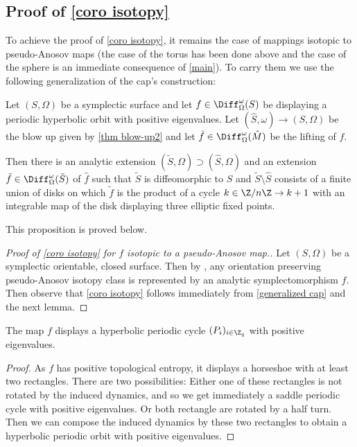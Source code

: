 \subsection{Proof of \cref{coro isotopy}}\label{S42}
To achieve the proof of \cref{coro isotopy}, it remains the case of mappings isotopic to pseudo-Anosov maps (the case of the torus has been done above and the case of the sphere is an immediate consequence of \cref{main}). To carry them we use the following generalization of the cap's construction:
\begin{proposition}\label{generalized cap}Let $(S,\Omega)$ be a symplectic surface and let $f\in \Diff^\omega_\Omega(S)$ be displaying a periodic hyperbolic orbit with positive eigenvalues.
Let $(\hat S,\omega)\to (S, \Omega)$ be the blow up given by \cref{thm blow-up2} and let $\hat f\in \Diff^\omega_\Omega(\hat M)$ be the lifting of $f$.

Then there is an analytic extension $(\tilde S,\Omega)\supset (\hat S,\Omega)$ and an extension $\tilde f\in \Diff^\omega_\Omega(\tilde S)$ of $\hat f$ such that $\tilde S$ is diffeomorphic to $S$ and $\tilde S\setminus \hat S$ consists of a finite union of disks on which $\tilde f$ is the product of a cycle $k\in \Z/n\Z\to k+1$ with an integrable map of the disk displaying three elliptic fixed points.
\end{proposition}
This proposition is proved below.
\begin{proof}[Proof of \cref{coro isotopy} for $f$ isotopic to a pseudo-Anosov map.]
Let $(S, \Omega)$ be a symplectic orientable, closed surface. Then by \cite{GK82,Ge85}, any orientation preserving pseudo-Anosov isotopy class is represented by an analytic symplectomorphism $f$. Then observe that \cref{coro isotopy} follows immediately from
\cref{generalized cap} and the next lemma. \end{proof}
\begin{lemma}
The map $f$ displays a hyperbolic periodic cycle $(P_i)_{i\in \Z_q}$ with positive eigenvalues.\end{lemma}
\begin{proof}
As $f$ has positive topological entropy, it displays a horseshoe \cite{Ka80} with at least two rectangles. There are two possibilities:
Either one of these rectangles is not rotated by the induced dynamics, and so we get immediately a saddle periodic cycle with positive eigenvalues. Or both rectangle are rotated by a half turn. Then we can compose the induced dynamics by these two rectangles to obtain a hyperbolic periodic orbit with positive eigenvalues.
\end{proof}

